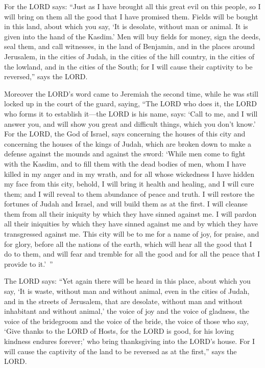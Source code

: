 \myverse{}For the LORD says: “Just as I have brought all this great evil on this people, so I will bring on them all the good that I have promised them. \myverse{}Fields will be bought in this land, about which you say, ‘It is desolate, without man or animal. It is given into the hand of the Kasdim.’ \myverse{}Men will buy fields for money, sign the deeds, seal them, and call witnesses, in the land of Benjamin, and in the places around Jerusalem, in the cities of Judah, in the cities of the hill country, in the cities of the lowland, and in the cities of the South; for I will cause their captivity to be reversed,” says the LORD.


\mychapter{}\myverse*{}Moreover the LORD’s word came to Jeremiah the second time, while he was still locked up in the court of the guard, saying, \myverse{}“The LORD who does it, the LORD who forms it to establish it—the LORD is his name, says: \myverse{}‘Call to me, and I will answer you, and will show you great and difficult things, which you don’t know.’ \myverse{}For the LORD, the God of Israel, says concerning the houses of this city and concerning the houses of the kings of Judah, which are broken down to make a defense against the mounds and against the sword: \myverse{}‘While men come to fight with the Kasdim, and to fill them with the dead bodies of men, whom I have killed in my anger and in my wrath, and for all whose wickedness I have hidden my face from this city, \myverse{}behold, I will bring it health and healing, and I will cure them; and I will reveal to them abundance of peace and truth. \myverse{}I will restore the fortunes of Judah and Israel, and will build them as at the first. \myverse{}I will cleanse them from all their iniquity by which they have sinned against me. I will pardon all their iniquities by which they have sinned against me and by which they have transgressed against me. \myverse{}This city will be to me for a name of joy, for praise, and for glory, before all the nations of the earth, which will hear all the good that I do to them, and will fear and tremble for all the good and for all the peace that I provide to it.’ ”


\myverse{}The LORD says: “Yet again there will be heard in this place, about which you say, ‘It is waste, without man and without animal, even in the cities of Judah, and in the streets of Jerusalem, that are desolate, without man and without inhabitant and without animal,’ \myverse{}the voice of joy and the voice of gladness, the voice of the bridegroom and the voice of the bride, the voice of those who say, ‘Give thanks to the LORD of Hosts, for the LORD is good, for his loving kindness endures forever;’ who bring thanksgiving into the LORD’s house. For I will cause the captivity of the land to be reversed as at the first,” says the LORD.


